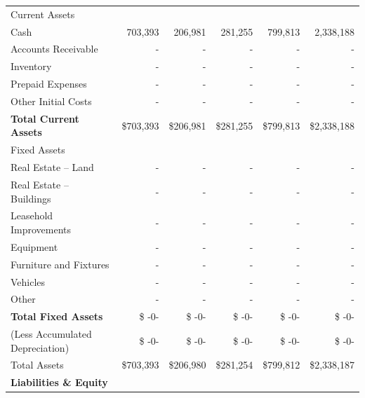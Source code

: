 \documentclass[10pt,openany]{book}
\begin{document}
\begin{landscape}
\begin{center}
\begin{longtable}[]{@{}lrrrrr@{}}
      \midrule
      \hspace{0mm} Current Assets & & & & & \\
      \hspace{3mm} Cash & 703,393 & 206,981 & 281,255 & 799,813 & 2,338,188 \\
      \hspace{3mm} Accounts Receivable & - & - & - & - & - \\
      \hspace{3mm} Inventory & - & - & - & - & - \\
      \hspace{3mm} Prepaid Expenses & - & - & - & - & - \\
      \hspace{3mm} Other Initial Costs & - & - & - & - & - \\
      \hfill \textbf{Total Current Assets} & \$703,393 & \$206,981 & \$281,255 & \$799,813 & \$2,338,188 \\
      \hspace{0mm} Fixed Assets & & & & & \\
      \hspace{3mm} Real Estate -- Land & - & - & - & - & - \\
      \hspace{3mm} Real Estate -- Buildings & - & - & - & - & - \\
      \hspace{3mm} Leasehold Improvements & - & - & - & - & - \\
      \hspace{3mm} Equipment & - & - & - & - & - \\
      \hspace{3mm} Furniture and Fixtures & - & - & - & - & - \\
      \hspace{3mm} Vehicles & - & - & - & - & - \\
      \hspace{3mm} Other & - & - & - & - & - \\
      \hfill \textbf{Total Fixed Assets} & \$ -0- & \$ -0- & \$ -0- & \$ -0- & \$ -0- \\
      \hspace{3mm} (Less Accumulated Depreciation) & \$ -0- & \$ -0- & \$ -0- & \$ -0- & \$ -0- \\
      \hspace{0mm} Total Assets & \$703,393 & \$206,980 & \$281,254 & \$799,812 & \$2,338,187 \\
      \textbf{Liabilities \& Equity} & & & & & \\

\end{longtable}
\end{center}
\end{landscape}
\end{document}

